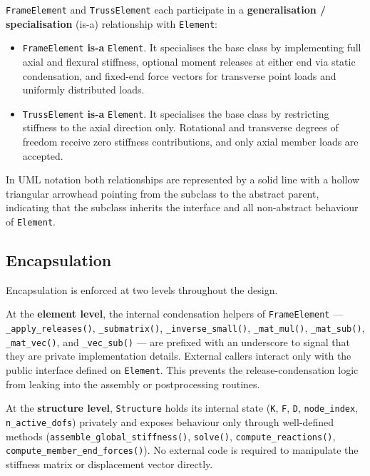 \texttt{FrameElement} and \texttt{TrussElement} each participate in a
\textbf{generalisation / specialisation} (is-a) relationship with
\texttt{Element}:

\begin{itemize}
  \item \texttt{FrameElement} \textbf{is-a} \texttt{Element}.
  It specialises the base class by implementing full axial and flexural
  stiffness, optional moment releases at either end via static
  condensation, and fixed-end force vectors for transverse point loads
  and uniformly distributed loads.

  \item \texttt{TrussElement} \textbf{is-a} \texttt{Element}.
  It specialises the base class by restricting stiffness to the axial
  direction only. Rotational and transverse degrees of freedom receive
  zero stiffness contributions, and only axial member loads are
  accepted.
\end{itemize}

In UML notation both relationships are represented by a solid line with a
hollow triangular arrowhead pointing from the subclass to the abstract
parent, indicating that the subclass inherits the interface and all
non-abstract behaviour of \texttt{Element}.

\subsection*{Encapsulation}

Encapsulation is enforced at two levels throughout the design.

At the \textbf{element level}, the internal condensation helpers of
\texttt{FrameElement} --- \texttt{\_apply\_releases()},
\texttt{\_submatrix()}, \texttt{\_inverse\_small()},
\texttt{\_mat\_mul()}, \texttt{\_mat\_sub()}, \texttt{\_mat\_vec()}, and
\texttt{\_vec\_sub()} --- are prefixed with an underscore to signal that
they are private implementation details.
External callers interact only with the public interface defined on
\texttt{Element}.
This prevents the release-condensation logic from leaking into the
assembly or postprocessing routines.

At the \textbf{structure level}, \texttt{Structure} holds its internal
state (\texttt{K}, \texttt{F}, \texttt{D}, \texttt{node\_index},
\texttt{n\_active\_dofs}) privately and exposes behaviour only through
well-defined methods (\texttt{assemble\_global\_stiffness()},
\texttt{solve()}, \texttt{compute\_reactions()},
\texttt{compute\_member\_end\_forces()}).
No external code is required to manipulate the stiffness matrix or
displacement vector directly.

